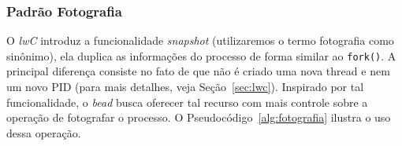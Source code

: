 \subsubsection{Padrão Fotografia}

O \emph{lwC} introduz a funcionalidade \emph{snapshot} (utilizaremos o termo
fotografia como sinônimo), ela duplica as informações do processo de forma
similar ao \texttt{fork()}. A principal diferença consiste no fato de que não é
criado uma nova thread e nem um novo PID (para mais detalhes, veja
Seção~\ref{sec:lwc}). Inspirado por tal funcionalidade, o \emph{bead} busca
oferecer tal recurso com mais controle sobre a operação de fotografar o
processo. O Pseudocódigo~\ref{alg:fotografia} ilustra o uso dessa operação.




